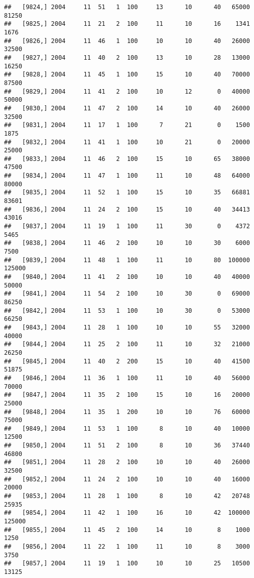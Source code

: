 \documentclass{article}\usepackage[]{graphicx}\usepackage[]{color}
\makeatletter
\newenvironment{kframe}{%
 \def\at@end@of@kframe{}%
 \ifinner\ifhmode%
  \def\at@end@of@kframe{\end{minipage}}%
  \begin{minipage}{\columnwidth}%
 \fi\fi%
 \def\FrameCommand##1{\hskip\@totalleftmargin \hskip-\fboxsep
 \colorbox{shadecolor}{##1}\hskip-\fboxsep
     \hskip-\linewidth \hskip-\@totalleftmargin \hskip\columnwidth}%
 \MakeFramed {\advance\hsize-\width
   \@totalleftmargin\z@ \linewidth\hsize
   \@setminipage}}%
 {\par\unskip\endMakeFramed%
 \at@end@of@kframe}
\newenvironment{knitrout}{}{} %
\makeatother
\begin{document}
\begin{knitrout}
\begin{kframe}
\begin{verbatim}
##   [9824,] 2004     11  51   1  100     13      10      40   65000   81250
##   [9825,] 2004     11  21   2  100     11      10      16    1341    1676
##   [9826,] 2004     11  46   1  100     10      10      40   26000   32500
##   [9827,] 2004     11  40   2  100     13      10      28   13000   16250
##   [9828,] 2004     11  45   1  100     15      10      40   70000   87500
##   [9829,] 2004     11  41   2  100     10      12       0   40000   50000
##   [9830,] 2004     11  47   2  100     14      10      40   26000   32500
##   [9831,] 2004     11  17   1  100      7      21       0    1500    1875
##   [9832,] 2004     11  41   1  100     10      21       0   20000   25000
##   [9833,] 2004     11  46   2  100     15      10      65   38000   47500
##   [9834,] 2004     11  47   1  100     11      10      48   64000   80000
##   [9835,] 2004     11  52   1  100     15      10      35   66881   83601
##   [9836,] 2004     11  24   2  100     15      10      40   34413   43016
##   [9837,] 2004     11  19   1  100     11      30       0    4372    5465
##   [9838,] 2004     11  46   2  100     10      10      30    6000    7500
##   [9839,] 2004     11  48   1  100     11      10      80  100000  125000
##   [9840,] 2004     11  41   2  100     10      10      40   40000   50000
##   [9841,] 2004     11  54   2  100     10      30       0   69000   86250
##   [9842,] 2004     11  53   1  100     10      30       0   53000   66250
##   [9843,] 2004     11  28   1  100     10      10      55   32000   40000
##   [9844,] 2004     11  25   2  100     11      10      32   21000   26250
##   [9845,] 2004     11  40   2  200     15      10      40   41500   51875
##   [9846,] 2004     11  36   1  100     11      10      40   56000   70000
##   [9847,] 2004     11  35   2  100     15      10      16   20000   25000
##   [9848,] 2004     11  35   1  200     10      10      76   60000   75000
##   [9849,] 2004     11  53   1  100      8      10      40   10000   12500
##   [9850,] 2004     11  51   2  100      8      10      36   37440   46800
##   [9851,] 2004     11  28   2  100     10      10      40   26000   32500
##   [9852,] 2004     11  24   2  100     10      10      40   16000   20000
##   [9853,] 2004     11  28   1  100      8      10      42   20748   25935
##   [9854,] 2004     11  42   1  100     16      10      42  100000  125000
##   [9855,] 2004     11  45   2  100     14      10       8    1000    1250
##   [9856,] 2004     11  22   1  100     11      10       8    3000    3750
##   [9857,] 2004     11  19   1  100     10      10      25   10500   13125

\end{verbatim}
\end{kframe}
\end{knitrout}
\end{document}
